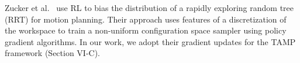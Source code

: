 Zucker et al.~\cite{workspacebias} use RL to bias the distribution of a rapidly exploring random tree (RRT)
for motion planning. Their approach uses features of a discretization of the workspace to train
a non-uniform configuration space sampler using policy gradient algorithms.
In our work, we adopt their gradient updates for the TAMP framework (Section VI-C).